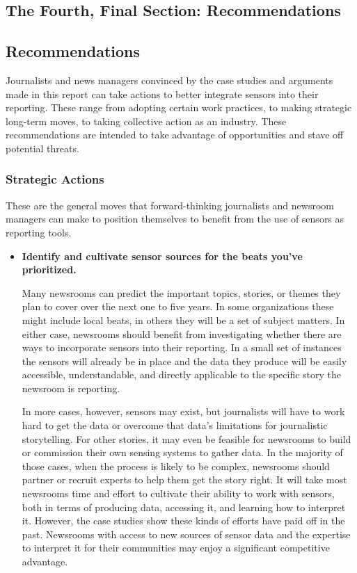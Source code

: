 \begin{itemize}
\begin{itemized}
\part{The Fourth, Final Section: Recommendations}

\chapter {Recommendations}
Journalists and news managers convinced by the case studies and arguments
made in this report can take actions to better integrate sensors into
their reporting. These range from adopting certain work practices, to making
strategic long-term moves, to taking collective action as an industry.
These recommendations are intended to take advantage of opportunities
and stave off potential threats.

\section{Strategic Actions}
These are the general moves that forward-thinking journalists and newsroom
managers can make to position themselves to benefit from the use of
sensors as reporting tools.
\begin{itemize}
\item \textbf{Identify and cultivate sensor sources for the beats
you've prioritized.}

Many newsrooms can predict the important topics, stories, or themes they
plan to cover over the next one to five years. In some organizations these
might include local beats, in others they will be a set of subject matters. In
either case, newsrooms should benefit from investigating whether there are
ways to incorporate sensors into their reporting. In a small set of instances
the sensors will already be in place and the data they produce will be easily
accessible, understandable, and directly applicable to the specific story the
newsroom is reporting.

In more cases, however, sensors may exist, but journalists will have to work
hard to get the data or overcome that data's limitations for journalistic storytelling.
For other stories, it may even be feasible for newsrooms to build
or commission their own sensing systems to gather data. In the majority of
those cases, when the process is likely to be complex, newsrooms should
partner or recruit experts to help them get the story right.
It will take most newsrooms time and effort to cultivate their ability to work
with sensors, both in terms of producing data, accessing it, and learning
how to interpret it. However, the case studies show these kinds of efforts
have paid off in the past. Newsrooms with access to new sources of sensor
data and the expertise to interpret it for their communities may enjoy a significant
competitive advantage.


\end{itemize}
\end{itemized}
\end{itemize}
